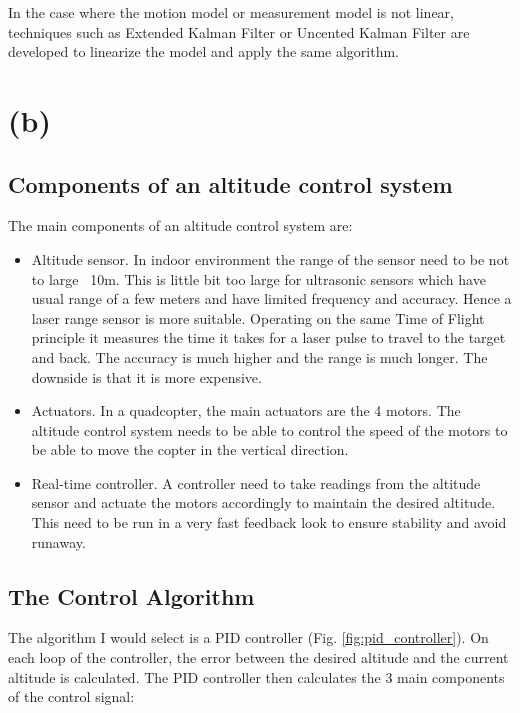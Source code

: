 \documentclass{report}
\begin{document}
In the case where the motion model or measurement model is not linear, techniques such as Extended Kalman Filter or Uncented Kalman Filter are developed to linearize the model and apply the same algorithm.

\section{(b)}

\subsection{Components of an altitude control system}

The main components of an altitude control system are:

\begin{itemize}
    \item Altitude sensor. In indoor environment the range of the sensor need to be not to large ~10m. This is little bit too large for ultrasonic sensors which have usual range of a few meters and have limited frequency and accuracy. Hence a laser range sensor is more suitable. Operating on the same Time of Flight principle it measures the time it takes for a laser pulse to travel to the target and back. The accuracy is much higher and the range is much longer. The downside is that it is more expensive.
    \item Actuators. In a quadcopter, the main actuators are the 4 motors. The altitude control system needs to be able to control the speed of the motors to be able to move the copter in the vertical direction.
    \item Real-time controller. A controller need to take readings from the altitude sensor and actuate the motors accordingly to maintain the desired altitude. This need to be run in a very fast feedback look to ensure stability and avoid runaway.
\end{itemize}

\subsection{The Control Algorithm}

The algorithm I would select is a PID controller (Fig. \ref*{fig:pid_controller}). On each loop of the controller, the error between the desired altitude and the current altitude is calculated. The PID controller then calculates the 3 main components of the control signal:
\end{document}
